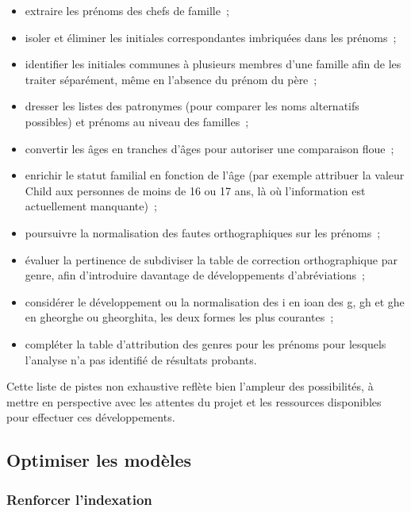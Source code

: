 \documentclass[a4paper,12pt,twoside]{book}
\begin{document}
                \begin{itemize}
                    \item extraire les prénoms des chefs de famille~;
                    \item isoler et éliminer les initiales correspondantes imbriquées dans les prénoms~;
                    \item identifier les initiales communes à plusieurs membres d'une famille afin de les traiter séparément, même en l'absence du prénom du père~;
                    \item dresser les listes des patronymes (pour comparer les noms alternatifs possibles) et prénoms au niveau des familles~;
                    \item convertir les âges en tranches d'âges pour autoriser une comparaison floue~;
                    \item enrichir le statut familial en fonction de l'âge (par exemple attribuer la valeur \og{}Child\fg{} aux personnes de moins de 16 ou 17 ans, là où l'information est actuellement manquante)~;
                    \item poursuivre la normalisation des fautes orthographiques sur les prénoms~;
                    \item évaluer la pertinence de subdiviser la table de correction orthographique par genre, afin d'introduire davantage de développements d'abréviations~;
                    \item considérer le développement ou la normalisation des \og{}i\fg{} en \og{}ioan\fg{} des \og{}g\fg{}, \og{}gh\fg{} et \og{}ghe\fg{} en \og{}gheorghe\fg{} ou \og{}gheorghita\fg{}, les deux formes les plus courantes~;
                    \item compléter la table d'attribution des genres pour les prénoms pour lesquels l'analyse n'a pas identifié de résultats probants.
                \end{itemize}
                
                Cette liste de pistes non exhaustive reflète bien l'ampleur des possibilités, à mettre en perspective avec les attentes du projet et les ressources disponibles pour effectuer ces développements.
                
            \subsection{Optimiser les modèles}
            
                \subsubsection{Renforcer l'indexation}
                
\end{document}
